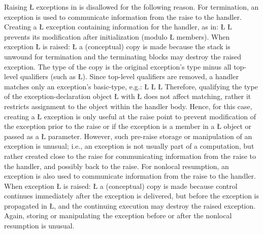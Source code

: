 \documentclass[openright,twoside]{report}
\begin{document}
Raising \LGinlinetrue\LGbegin\lgrinde\L{}\endlgrinde\LGend{} exceptions in \uC is disallowed for the following reason.
For termination, an exception is used to communicate information from the raise to the handler.
Creating a \LGinlinetrue\LGbegin\lgrinde\L{}\endlgrinde\LGend{} exception containing information for the handler, as in:
\LGinlinefalse\LGbegin\lgrinde
\L{}
\CE{}\L{}
\CE{}\endlgrinde\LGend
prevents its modification after initialization (modulo \LGinlinetrue\LGbegin\lgrinde\L{}\endlgrinde\LGend{} members).
When exception \LGinlinetrue\LGbegin\lgrinde\L{}\endlgrinde\LGend{} is raised:
\LGinlinefalse\LGbegin\lgrinde
\L{}
\CE{}\endlgrinde\LGend
a (conceptual) copy is made because the stack is unwound for termination and the terminating blocks may destroy the raised exception.
The type of the copy is the original exception's type minus all top-level qualifiers (such as \LGinlinetrue\LGbegin\lgrinde\L{}\endlgrinde\LGend{}).
Since top-level qualifiers are removed, a handler matches only an exception's basic-type, e.g.:
\LGinlinefalse\LGbegin\lgrinde
\L{}
\L{\LB{}}
\L{}
\CE{}\endlgrinde\LGend
Therefore, qualifying the type of the exception-declaration object \LGinlinetrue\LGbegin\lgrinde\L{}\endlgrinde\LGend{} with \LGinlinetrue\LGbegin\lgrinde\L{}\endlgrinde\LGend{} does not affect matching, rather it restricts assignment to the object within the handler body.
Hence, for this case, creating a \LGinlinetrue\LGbegin\lgrinde\L{}\endlgrinde\LGend{} exception is only useful at the raise point to prevent modification of the exception prior to the raise or if the exception is a member in a \LGinlinetrue\LGbegin\lgrinde\L{}\endlgrinde\LGend{} object or passed as a \LGinlinetrue\LGbegin\lgrinde\L{}\endlgrinde\LGend{} parameter.
However, such pre-raise storage or manipulation of an exception is unusual;
i.e., an exception is not usually part of a computation, but rather created close to the raise for communicating information from the raise to the handler, and possibly back to the raise.
For nonlocal resumption, an exception is also used to communicate information from the raise to the handler.
When exception \LGinlinetrue\LGbegin\lgrinde\L{}\endlgrinde\LGend{} is raised:
\LGinlinefalse\LGbegin\lgrinde
\L{}
\CE{}\endlgrinde\LGend
a (conceptual) copy is made because control continues immediately after the exception is delivered, but before the exception is propagated in \LGinlinetrue\LGbegin\lgrinde\L{}\endlgrinde\LGend{}, and the continuing execution may destroy the raised exception.
Again, storing or manipulating the exception before or after the nonlocal resumption is unusual.
\end{document}

